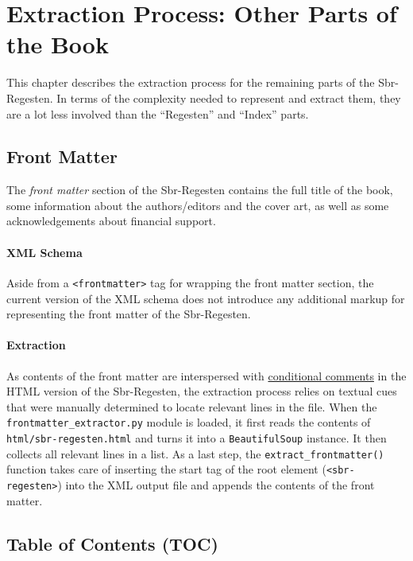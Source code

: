 \section{Extraction Process: Other Parts of the Book}
\label{sec:other}

This chapter describes the extraction process for the remaining parts
of the Sbr-Regesten. In terms of the complexity needed to represent
and extract them, they are a lot less involved than the ``Regesten''
and ``Index'' parts.

\subsection{Front Matter}
\label{sec:frontmatter}

The \emph{front matter} section of the Sbr-Regesten contains the full
title of the book, some information about the authors/editors and the
cover art, as well as some acknowledgements about financial support.

\paragraph{XML Schema}

Aside from a \texttt{<frontmatter>} tag for wrapping the front matter
section, the current version of the XML schema does not introduce any
additional markup for representing the front matter of the
Sbr-Regesten.

\paragraph{Extraction}

As contents of the front matter are interspersed with
\href{https://en.wikipedia.org/wiki/Conditional_comment}{conditional
  comments} in the HTML version of the Sbr-Regesten, the extraction
process relies on textual cues that were manually determined to locate
relevant lines in the file. When the
\texttt{frontmatter\_extractor.py} module is loaded, it first reads
the contents of \texttt{html/sbr-regesten.html} and turns it into a
\texttt{BeautifulSoup} instance. It then collects all relevant lines
in a list. As a last step, the \texttt{extract\_frontmatter()}
function takes care of inserting the start tag of the root element
(\texttt{<sbr-regesten>}) into the XML output file and appends the
contents of the front matter.

\subsection{Table of Contents (TOC)}
\label{sec:toc}

